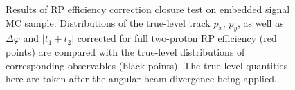 \begin{figure}[h]
{\begin{subfigure}[b]{\linewidth}
  \end{subfigure}
}%
\caption[Results of RP efficiency correction closure test on embedded signal MC sample.]{Results of RP efficiency correction closure test on embedded signal MC sample. Distributions of the true-level track $p_{x}$, $p_{y}$, as well as $\Delta\varphi$ and $|t_{1}+t_{2}|$ corrected for full two-proton RP efficiency (red points) are compared with the true-level distributions of corresponding observables (black points). The true-level quantities here are taken after the angular beam divergence being applied.}\label{fig:closureTestTpcTofSingleTrk}%
\end{figure}




